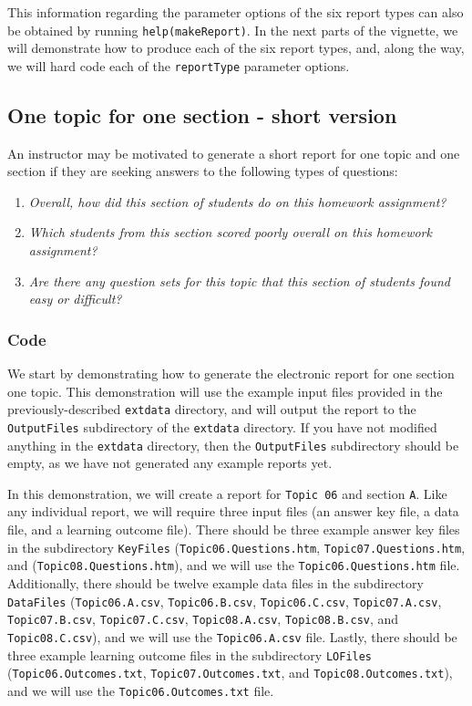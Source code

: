 \documentclass{article}\usepackage[]{graphicx}\usepackage[]{color}
\numberwithin{equation}{section} %
\begin{document}
This information regarding the parameter options of the six report types can also be obtained by running \texttt{help(makeReport)}. In the next parts of the vignette, we will demonstrate how to produce each of the six report types, and, along the way, we will hard code each of the \texttt{reportType} parameter options.

\subsection{One topic for one section - short version}
\label{sec:oneTopicSectionShort}

An instructor may be motivated to generate a short report for one topic and one section if they are seeking answers to the following types of questions:

\begin{enumerate}
\item \textit{Overall, how did this section of students do on this homework assignment?}
\item \textit{Which students from this section scored poorly overall on this homework assignment?}
\item \textit{Are there any question sets for this topic that this section of students found easy or difficult?}
\end{enumerate}

\subsubsection{Code}
\label{sec:codeOnce}

We start by demonstrating how to generate the electronic report for one section one topic. This demonstration will use the example input files provided in the previously-described \texttt{extdata} directory, and will output the report to the \texttt{OutputFiles} subdirectory of the \texttt{extdata} directory. If you have not modified anything in the \texttt{extdata} directory, then the \texttt{OutputFiles} subdirectory should be empty, as we have not generated any example reports yet. 

In this demonstration, we will create a report for \texttt{Topic 06} and section \texttt{A}. Like any individual report, we will require three input files (an answer key file, a data file, and a learning outcome file). There should be three example answer key files in the subdirectory \texttt{KeyFiles} (\texttt{Topic06.Questions.htm}, \texttt{Topic07.Questions.htm}, and (\texttt{Topic08.Questions.htm}), and we will use the \texttt{Topic06.Questions.htm} file. Additionally, there should be twelve example data files in the subdirectory \texttt{DataFiles} (\texttt{Topic06.A.csv}, \texttt{Topic06.B.csv}, \texttt{Topic06.C.csv}, \texttt{Topic07.A.csv}, \texttt{Topic07.B.csv}, \texttt{Topic07.C.csv}, \texttt{Topic08.A.csv}, \texttt{Topic08.B.csv}, and \texttt{Topic08.C.csv}), and we will use the \texttt{Topic06.A.csv} file. Lastly, there should be three example learning outcome files in the subdirectory \texttt{LOFiles} (\texttt{Topic06.Outcomes.txt}, \texttt{Topic07.Outcomes.txt}, and \texttt{Topic08.Outcomes.txt}), and we will use the \texttt{Topic06.Outcomes.txt} file.
\end{document}
